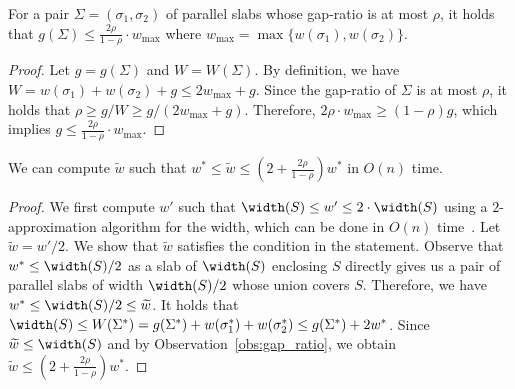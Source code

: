 \begin{observation}
    \label{obs:gap_ratio}
    For a pair $\Sigma = (\sigma_1, \sigma_2)$ of parallel slabs  whose gap-ratio is at most $\rho$,
    it holds that $g(\Sigma) \le \frac{2\rho}{1-\rho} \cdot w_{\max}$ where $w_{\max} = \max \{w(\sigma_1), w(\sigma_2)\}$. 

\begin{proof}
    Let $g = g(\Sigma)$ and $W = W(\Sigma)$.
    By definition, we have $W = w(\sigma_1) + w(\sigma_2) + g \le 2w_{\max} + g$.
    Since the gap-ratio of $\Sigma$ is at most $\rho$, it holds that $\rho \ge g/W \ge g/(2w_{\max} + g)$.
    Therefore, $2\rho\cdot w_{\max} \ge (1-\rho)g$, which implies $g \le \frac{2\rho}{1-\rho}\cdot w_{\max}$.   
\end{proof}
    
\end{observation}

\begin{lemma}
\label{lem:small_gap_const}
We can compute $\widetilde w$ such that $w^* \le \widetilde w \le (2 + \frac{2\rho}{1-\rho} ) w^* $ in $O(n)$ time.
\end{lemma}

\begin{proof}
We first compute $w'$ such that $\width(S) \le w' \le 2\cdot \width(S)$ using a $2$-approximation algorithm for the width, 
which can be done in $O(n)$ time~\cite{chan2006faster}. 
Let $\widetilde w = w'/2$. 
We show that $\widetilde w$ satisfies the condition in the statement. Observe that $w^* \le \width(S)/2$ as a slab of $\width(S)$ enclosing $S$ directly gives us a pair of parallel slabs of width $\width(S)/2$ whose union covers $S$. 
Therefore, we have $w^* \le \width(S)/2 \le \widetilde w$. It holds that $\width(S) \le W(\Sigma^*) = g(\Sigma^*) + w(\sigma_1^*) + w(\sigma_2^*) \le g(\Sigma^*) + 2w^*$. Since $\widetilde w \le \width(S)$ and by Observation~\ref{obs:gap_ratio}, we obtain $\widetilde w \le (2 + \frac{2\rho}{1-\rho}) w^*$.
\end{proof}




